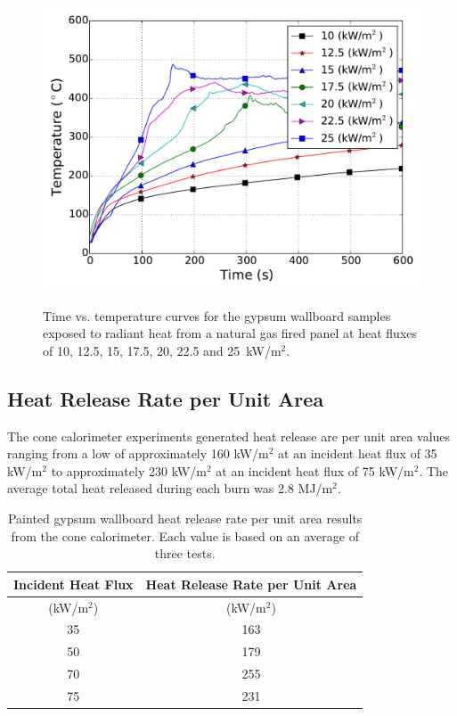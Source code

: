 \documentclass[twoside]{uocthesis}
\begin{document}
\begin{figure}[p]
	\centering
	\includegraphics[width=\textwidth]{../Figures/RP_GB_Front} \\
	\caption[Time vs. temperature curves for the gypsum wallboard samples exposed to radiant heat from a natural gas fired panel]{Time vs. temperature curves for the gypsum wallboard samples exposed to radiant heat from a natural gas fired panel at heat fluxes of 10, 12.5, 15, 17.5, 20, 22.5 and 25~kW/m$^2$.}
	\label{RP_GB_Front}
\end{figure}



\subsection{Heat Release Rate per Unit Area}

The cone calorimeter experiments generated heat release are per unit area values ranging from a low of approximately 160 kW/m$^2$ at an incident heat flux of 35 kW/m$^2$ to approximately 230 kW/m$^2$ at an incident heat flux of 75 kW/m$^2$.  The average total heat released during each burn was 2.8 MJ/m$^2$.    

\begin{table}
	\centering
	\begin{tabular}{|c|c|}
		\hline Incident Heat Flux & Heat Release Rate per Unit Area    \\
		\hline (kW/m$^2$) & (kW/m$^2$)  \\
		\hline 35 	& 163 	\\
		\hline 50	& 179   \\
		\hline 70	& 255  	\\
		\hline 75	& 231 	\\
		\hline
	\end{tabular}
	\caption[Painted gypsum wallboard time heat release rate per unit area results]{Painted gypsum wallboard heat release rate per unit area results from the cone calorimeter. Each value is based on an average of three tests.}
	\label{tab:Gypsum wallboard_HRRA}
\end{table}
\end{document}
